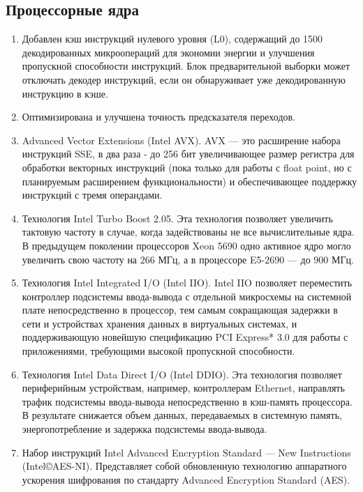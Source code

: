 \documentclass[a4paper,12pt,notitlepage,headsepline,pdftex]{scrartcl}
\begin{document}
\subsection{Процессорные ядра}
  \begin{enumerate}
    \item Добавлен кэш инструкций нулевого уровня (L0), содержащий до 1500
      декодированных микроопераций для экономии энергии и улучшения пропускной
      способности инструкций.
      Блок предварительной выборки может отключать декодер инструкций, если он
      обнаруживает уже декодированную инструкцию в кэше.
    \item Оптимизирована и улучшена точность предсказателя переходов.
    \item Advanced Vector Extensions (Intel AVX).
      AVX --- это расширение набора инструкций SSE, в два раза - до 256 бит
      увеличивающее размер регистра для обработки векторных инструкций (пока
      только для работы с float point, но с планируемым расширением
      функциональности) и обеспечивающее поддержку инструкций с тремя
      операндами.
    \item Технология Intel Turbo Boost 2.05.
      Эта технология позволяет увеличить тактовую частоту в случае, когда
      задействованы не все вычислительные ядра.
      В предыдущем поколении процессоров Xeon 5690 одно активное ядро могло
      увеличить свою частоту на 266 МГц, а в процессоре E5-2690 --- до 900 МГц.
    \item Технология Intel Integrated I/O (Intel IIO).
      Intel IIO позволяет переместить контроллер подсистемы ввода-вывода с
      отдельной микросхемы на системной плате непосредственно в процессор, тем
      самым сокращающая задержки в сети и устройствах хранения данных в
      виртуальных системах, и поддерживающую новейшую спецификацию PCI
      Express* 3.0 для работы с приложениями, требующими высокой пропускной
      способности.
    \item Технология Intel Data Direct I/O (Intel DDIO).
      Эта технология позволяет периферийным устройствам, например,
      контроллерам Ethernet, направлять трафик подсистемы ввода-вывода
      непосредственно в кэш-память процессора.
      В результате снижается объем данных, передаваемых в системную память,
      энергопотребление и задержка подсистемы ввода-вывода.
    \item Набор инструкций Intel Advanced Encryption Standard --- New
      Instructions (Intel\copyright AES-NI).
      Представляет собой обновленную технологию аппаратного ускорения
      шифрования по стандарту Advanced Encryption Standard (AES).
  \end{enumerate}
\end{document}
